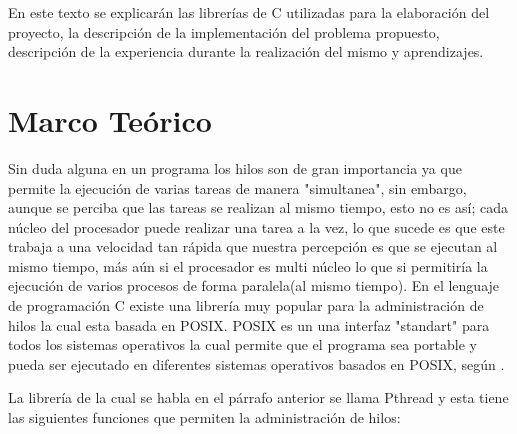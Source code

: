 \documentclass[16pt,a4papper]{article}
\begin{document}
	En este texto se explicarán las librerías de C utilizadas para la elaboración del proyecto, la descripción de la implementación del problema propuesto, descripción de la experiencia durante la realización del mismo y aprendizajes.\par
	
	\newpage
	\section{Marco Teórico}
	Sin duda alguna en un programa los hilos son de gran importancia ya que permite la ejecución de varias tareas de manera "simultanea", sin embargo, aunque se perciba que las tareas se realizan al mismo tiempo, esto no es así; cada núcleo del procesador puede realizar una tarea a la vez, lo que sucede es que este trabaja a una velocidad tan rápida que nuestra percepción es que se ejecutan al mismo tiempo, más aún si el procesador es multi núcleo lo que si permitiría la ejecución de varios procesos de forma paralela(al mismo tiempo). En el lenguaje de programación C existe una librería muy popular para la administración de hilos la cual esta basada en POSIX. POSIX es un una interfaz "standart" para todos los sistemas operativos la cual permite que el programa sea portable y pueda ser ejecutado en diferentes sistemas operativos basados en POSIX, según \cite{POSIX_documentation}.\par 
	
	La librería de la cual se habla en el párrafo anterior se llama Pthread y esta tiene las siguientes funciones que permiten la administración de hilos:\par
	
\end{document}
